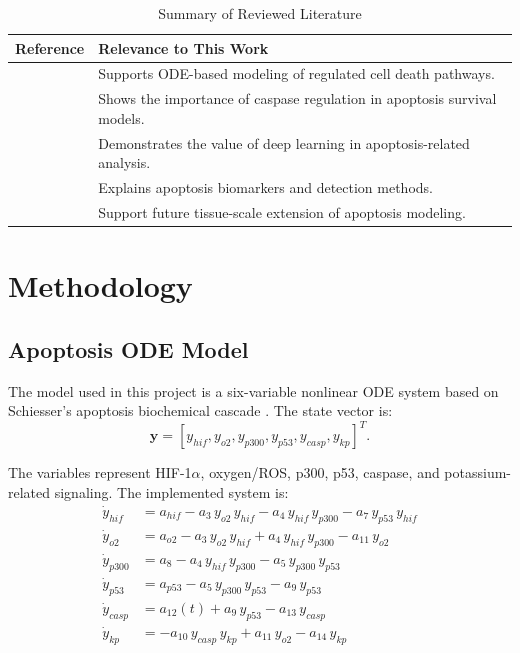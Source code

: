 \documentclass[conference]{IEEEtran}
\begin{document}
\begin{table}[htbp]
\caption{Summary of Reviewed Literature}
\label{tab:lit_review}
\centering
\small
\begin{tabularx}{\linewidth}{l X}
\toprule
\textbf{Reference} & \textbf{Relevance to This Work} \\
\midrule
\cite{kutumova2025} & Supports ODE-based modeling of regulated cell death pathways. \\
\cite{burt2022} & Shows the importance of caspase regulation in apoptosis survival models. \\
\cite{schorpp2023} & Demonstrates the value of deep learning in apoptosis-related analysis. \\
\cite{kari2022} & Explains apoptosis biomarkers and detection methods. \\
\cite{softmatter2022,prl2024} & Support future tissue-scale extension of apoptosis modeling. \\
\bottomrule
\end{tabularx}
\end{table}

\section{Methodology}

\subsection{Apoptosis ODE Model}
The model used in this project is a six-variable nonlinear ODE system based on Schiesser's apoptosis biochemical cascade \cite{schiesser2014}. The state vector is:
\begin{equation}
\mathbf{y}=[y_{hif},y_{o2},y_{p300},y_{p53},y_{casp},y_{kp}]^T.
\end{equation}

The variables represent HIF-1$\alpha$, oxygen/ROS, p300, p53, caspase, and potassium-related signaling. The implemented system is:
\begin{align}
\dot{y}_{hif}  &= a_{hif} - a_3\, y_{o2}\, y_{hif} - a_4\, y_{hif}\, y_{p300} - a_7\, y_{p53}\, y_{hif} \\
\dot{y}_{o2}   &= a_{o2}  - a_3\, y_{o2}\, y_{hif} + a_4\, y_{hif}\, y_{p300} - a_{11}\, y_{o2} \\
\dot{y}_{p300} &= a_8     - a_4\, y_{hif}\, y_{p300} - a_5\, y_{p300}\, y_{p53} \\
\dot{y}_{p53}  &= a_{p53} - a_5\, y_{p300}\, y_{p53} - a_9\, y_{p53} \\
\dot{y}_{casp} &= a_{12}(t) + a_9\, y_{p53} - a_{13}\, y_{casp} \\
\dot{y}_{kp}   &= -a_{10}\, y_{casp}\, y_{kp} + a_{11}\, y_{o2} - a_{14}\, y_{kp}
\end{align}
\end{document}
